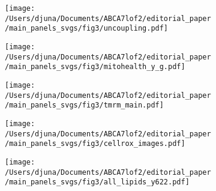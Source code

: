 \documentclass[12pt]{article}
\begin{document}
\begin{figure}[H]
\begin{subfigure}[t]{.25\textwidth}
\begin{subfigure}[t]{\textwidth}
        \end{subfigure}  
    \end{subfigure} 
    \begin{subfigure}[t]{.2\textwidth}
        \caption{}
            \texttt{[image: /Users/djuna/Documents/ABCA7lof2/editorial\_paper/main\_panels\_svgs/fig3/uncoupling.pdf]}        
    \end{subfigure}   
    \begin{subfigure}[t]{.5\textwidth}
        \caption{}
        \texttt{[image: /Users/djuna/Documents/ABCA7lof2/editorial\_paper/main\_panels\_svgs/fig3/mitohealth\_y\_g.pdf]}        
    \end{subfigure}    
    \begin{subfigure}[t]{.35\textwidth}
        \caption{}
        \texttt{[image: /Users/djuna/Documents/ABCA7lof2/editorial\_paper/main\_panels\_svgs/fig3/tmrm\_main.pdf]}        %
    \end{subfigure}    
    \begin{subfigure}[t]{.35\textwidth}
        \caption{}
        \texttt{[image: /Users/djuna/Documents/ABCA7lof2/editorial\_paper/main\_panels\_svgs/fig3/cellrox\_images.pdf]}        
    \end{subfigure}  
    \begin{subfigure}[t]{.2\textwidth}
        \caption{}
        \texttt{[image: /Users/djuna/Documents/ABCA7lof2/editorial\_paper/main\_panels\_svgs/fig3/all\_lipids\_y622.pdf]}        
    \end{subfigure}  
\end{figure}
\end{document}
